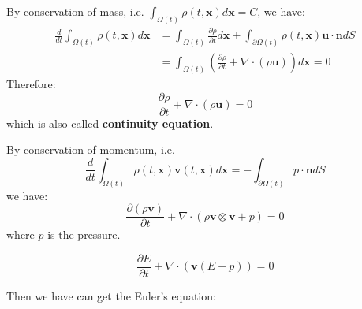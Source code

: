 \begin{theorem}
    By conservation of mass, i.e. $\int_{\Omega(t)} \rho(t, \mathbf{x}) d\mathbf{x} = C$, we have:
    \begin{equation}
        \begin{aligned}
            \frac{d}{dt}\int_{\Omega(t)} \rho(t, \mathbf{x}) d\mathbf{x} &= \int_{\Omega(t)} \frac{\partial \rho}{\partial t} d\mathbf{x} + \int_{\partial \Omega(t)} \rho(t, \mathbf{x}) \mathbf{u} \cdot \mathbf{n} d S\\ 
            &= \int_{\Omega(t)} \left(\frac{\partial \rho}{\partial t}  + \nabla\cdot \left(\rho\mathbf{u}\right)\right) d\mathbf{x}=0
        \end{aligned}
    \end{equation}
    Therefore:
    \begin{equation}
        \frac{\partial \rho}{\partial t}  + \nabla\cdot \left(\rho\mathbf{u}\right) = 0
    \end{equation}
    which is also called \textbf{continuity equation}.
\end{theorem}
\begin{theorem}
    By conservation of momentum, i.e. 
    \begin{equation}
        \frac{d}{dt}\int_{\Omega(t)} \rho(t, \mathbf{x})\mathbf{v}(t, \mathbf{x}) d\mathbf{x} = -\int_{\partial \Omega(t)} p\cdot \mathbf{n} d S
    \end{equation}
    we have:
    \begin{equation}
        \frac{\partial (\rho \mathbf{v})}{\partial t} + \nabla\cdot \left(\rho \mathbf{v} \otimes \mathbf{v} + p\right) = 0
    \end{equation}
    where $p$ is the pressure.
\end{theorem}
\begin{theorem}
    \begin{equation}
        \frac{\partial E}{\partial t} + \nabla\cdot \left(\mathbf{v}(E + p)\right) = 0
    \end{equation}
\end{theorem}
Then we have can get the Euler's equation:
